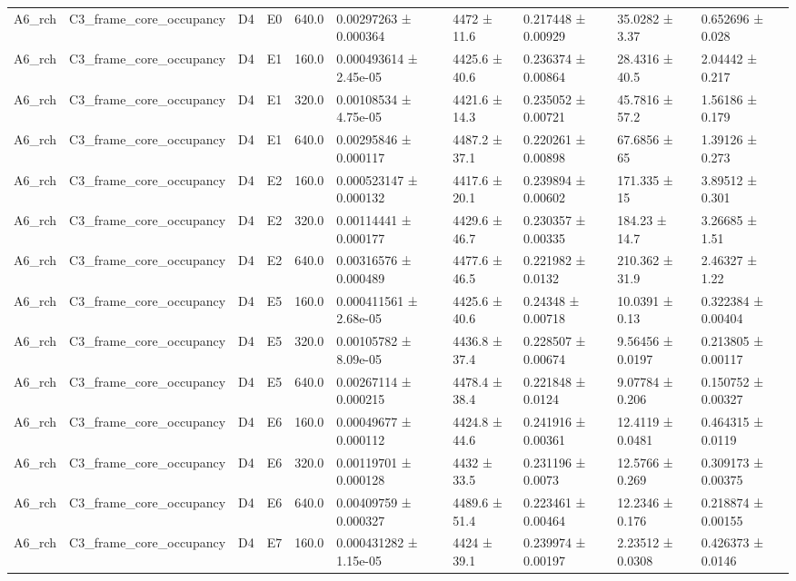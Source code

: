 \begin{table}
\begin{tabular}{llllllllll}
A6\_rch & C3\_frame\_core\_occupancy & D4 & E0 & 640.0 & 0.00297263 ± 0.000364 & 4472 ± 11.6 & 0.217448 ± 0.00929 & 35.0282 ± 3.37 & 0.652696 ± 0.028 \\
A6\_rch & C3\_frame\_core\_occupancy & D4 & E1 & 160.0 & 0.000493614 ± 2.45e-05 & 4425.6 ± 40.6 & 0.236374 ± 0.00864 & 28.4316 ± 40.5 & 2.04442 ± 0.217 \\
A6\_rch & C3\_frame\_core\_occupancy & D4 & E1 & 320.0 & 0.00108534 ± 4.75e-05 & 4421.6 ± 14.3 & 0.235052 ± 0.00721 & 45.7816 ± 57.2 & 1.56186 ± 0.179 \\
A6\_rch & C3\_frame\_core\_occupancy & D4 & E1 & 640.0 & 0.00295846 ± 0.000117 & 4487.2 ± 37.1 & 0.220261 ± 0.00898 & 67.6856 ± 65 & 1.39126 ± 0.273 \\
A6\_rch & C3\_frame\_core\_occupancy & D4 & E2 & 160.0 & 0.000523147 ± 0.000132 & 4417.6 ± 20.1 & 0.239894 ± 0.00602 & 171.335 ± 15 & 3.89512 ± 0.301 \\
A6\_rch & C3\_frame\_core\_occupancy & D4 & E2 & 320.0 & 0.00114441 ± 0.000177 & 4429.6 ± 46.7 & 0.230357 ± 0.00335 & 184.23 ± 14.7 & 3.26685 ± 1.51 \\
A6\_rch & C3\_frame\_core\_occupancy & D4 & E2 & 640.0 & 0.00316576 ± 0.000489 & 4477.6 ± 46.5 & 0.221982 ± 0.0132 & 210.362 ± 31.9 & 2.46327 ± 1.22 \\
A6\_rch & C3\_frame\_core\_occupancy & D4 & E5 & 160.0 & 0.000411561 ± 2.68e-05 & 4425.6 ± 40.6 & 0.24348 ± 0.00718 & 10.0391 ± 0.13 & 0.322384 ± 0.00404 \\
A6\_rch & C3\_frame\_core\_occupancy & D4 & E5 & 320.0 & 0.00105782 ± 8.09e-05 & 4436.8 ± 37.4 & 0.228507 ± 0.00674 & 9.56456 ± 0.0197 & 0.213805 ± 0.00117 \\
A6\_rch & C3\_frame\_core\_occupancy & D4 & E5 & 640.0 & 0.00267114 ± 0.000215 & 4478.4 ± 38.4 & 0.221848 ± 0.0124 & 9.07784 ± 0.206 & 0.150752 ± 0.00327 \\
A6\_rch & C3\_frame\_core\_occupancy & D4 & E6 & 160.0 & 0.00049677 ± 0.000112 & 4424.8 ± 44.6 & 0.241916 ± 0.00361 & 12.4119 ± 0.0481 & 0.464315 ± 0.0119 \\
A6\_rch & C3\_frame\_core\_occupancy & D4 & E6 & 320.0 & 0.00119701 ± 0.000128 & 4432 ± 33.5 & 0.231196 ± 0.0073 & 12.5766 ± 0.269 & 0.309173 ± 0.00375 \\
A6\_rch & C3\_frame\_core\_occupancy & D4 & E6 & 640.0 & 0.00409759 ± 0.000327 & 4489.6 ± 51.4 & 0.223461 ± 0.00464 & 12.2346 ± 0.176 & 0.218874 ± 0.00155 \\
A6\_rch & C3\_frame\_core\_occupancy & D4 & E7 & 160.0 & 0.000431282 ± 1.15e-05 & 4424 ± 39.1 & 0.239974 ± 0.00197 & 2.23512 ± 0.0308 & 0.426373 ± 0.0146 \\

\end{tabular}
\end{table}
